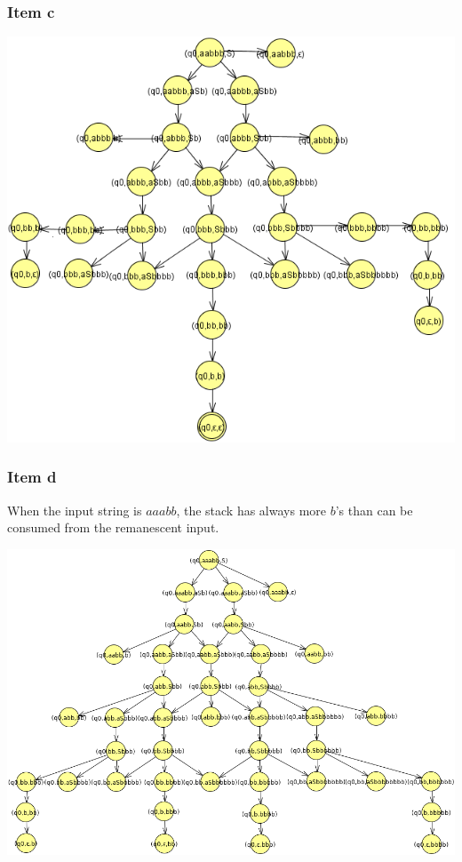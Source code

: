 \documentclass[docid=TP09]{tcom_TP}
\begin{document}
{\subsubsection{Item c}
\begin{center} \includegraphics[scale=0.45]{TP09_1c} \end{center}
\pagebreak
\subsubsection{Item d}
When the input string is $aaabb$, the stack has always more $b$'s than can be consumed from the remanescent input.
\begin{center} \includegraphics[scale=0.45]{TP09_1d} \end{center}
}
\end{document}
